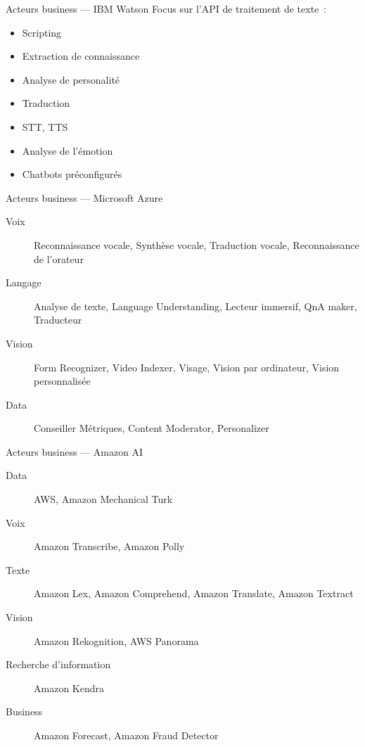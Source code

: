 \begin{frame}{Acteurs business --- IBM Watson}
  Focus sur l'API de traitement de texte~:
  \begin{minipage}[c]{0.49\linewidth}
    \begin{itemize}
    \item Scripting
    \item Extraction de connaissance
    \item Analyse de personalité
    \item Traduction
    \end{itemize}
  \end{minipage}\hfill
  \begin{minipage}[c]{0.50\linewidth}
    \begin{itemize}
    \item STT, TTS
    \item Analyse de l'émotion
    \item Chatbots préconfigurés
    \end{itemize}
  \end{minipage}\hfill
\end{frame}

\begin{frame}{Acteurs business --- Microsoft Azure}
  \begin{description}
    \item[Voix] Reconnaissance vocale, Synthèse vocale, Traduction vocale, Reconnaissance de l'orateur
    \item[Langage] Analyse de texte, Language Understanding, Lecteur immersif, QnA maker, Traducteur
    \item[Vision] Form Recognizer, Video Indexer, Visage, Vision par ordinateur, Vision personnalisée
    \item[Data] Conseiller Métriques, Content Moderator, Personalizer
  \end{description}
\end{frame}

\begin{frame}{Acteurs business --- Amazon AI}
  \begin{description}
    \item[Data] AWS, Amazon Mechanical Turk
    \item[Voix] Amazon Transcribe, Amazon Polly
    \item[Texte] Amazon Lex, Amazon Comprehend, Amazon Translate, Amazon Textract
    \item[Vision] Amazon Rekognition, AWS Panorama
    \item[Recherche d'information] Amazon Kendra
    \item[Business] Amazon Forecast, Amazon Fraud Detector
  \end{description}
\end{frame}


